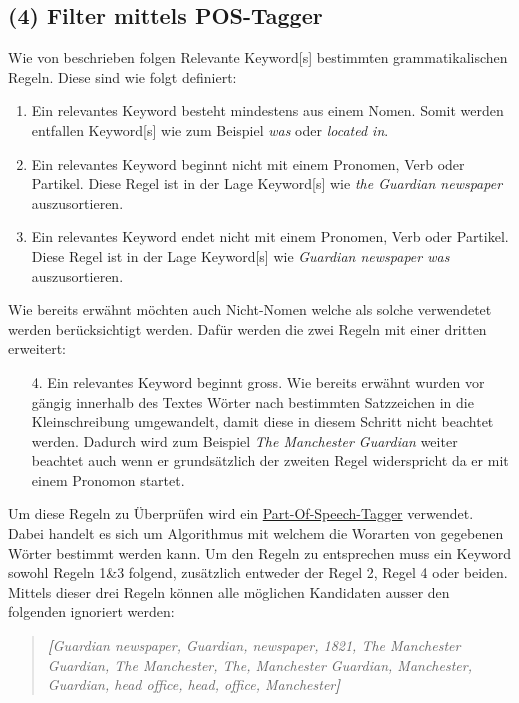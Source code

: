 \subsection{(4) Filter mittels POS-Tagger}
Wie von \cite{parameswaran2010towards} beschrieben folgen Relevante \gls{Keyword}[s] bestimmten grammatikalischen Regeln. Diese sind wie folgt definiert:
\begin{enumerate}
    \item Ein relevantes \gls{Keyword} besteht mindestens aus einem Nomen. Somit werden entfallen \gls{Keyword}[s] wie zum Beispiel \textit{was} oder \textit{located in}.
    \item Ein relevantes \gls{Keyword} beginnt nicht mit einem Pronomen, Verb oder Partikel. Diese Regel ist in der Lage \gls{Keyword}[s] wie \textit{the Guardian newspaper} auszusortieren.
    \item Ein relevantes \gls{Keyword} endet nicht mit einem Pronomen, Verb oder Partikel. Diese Regel ist in der Lage \gls{Keyword}[s] wie \textit{Guardian newspaper was} auszusortieren.
\end{enumerate}
Wie bereits erwähnt möchten auch Nicht-Nomen welche als solche verwendetet werden berücksichtigt werden. Dafür werden die zwei Regeln mit einer dritten erweitert:
\begin{enumerate}
    \item[4.] Ein relevantes \gls{Keyword} beginnt gross. Wie bereits erwähnt wurden vor gängig innerhalb des Textes Wörter nach bestimmten Satzzeichen in die Kleinschreibung umgewandelt, damit diese in diesem Schritt nicht beachtet werden. Dadurch wird zum Beispiel \textit{The Manchester Guardian} weiter beachtet auch wenn er grundsätzlich der zweiten Regel widerspricht da er mit einem Pronomon startet. 
\end{enumerate}
Um diese Regeln zu Überprüfen wird ein \hyperref[part-of-speech]{Part-Of-Speech-Tagger} verwendet. Dabei handelt es sich um Algorithmus mit welchem die Worarten von gegebenen Wörter bestimmt werden kann. Um den Regeln zu entsprechen muss ein \gls{Keyword} sowohl Regeln 1\&3 folgend, zusätzlich entweder der Regel 2, Regel 4 oder beiden. Mittels dieser drei Regeln können alle möglichen Kandidaten ausser den folgenden ignoriert werden:

\begin{quote}
\textit{\textbf{[}Guardian newspaper, Guardian, newspaper, 1821, The Manchester Guardian, The Manchester, The, Manchester Guardian, Manchester, Guardian, head office, head, office, Manchester\textbf{]}}
\end{quote}

